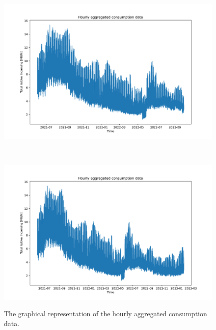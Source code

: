 \begin{figure}[H]
\begin{minipage}[b]{8.5cm}
\centering
\includegraphics[width=1\textwidth]{images/demand/data_plot}
\subcaption{}
\label{fig:demanddataplot}
\end{minipage}
\ \hspace{2mm} \
\begin{minipage}[b]{8.5cm}
\centering
\includegraphics[width=1\textwidth]{images/demand/data_plot_2}
\subcaption{}
\label{fig:demanddataplot2}
\end{minipage}
\caption{The graphical representation of the hourly aggregated consumption data.}
\end{figure}


